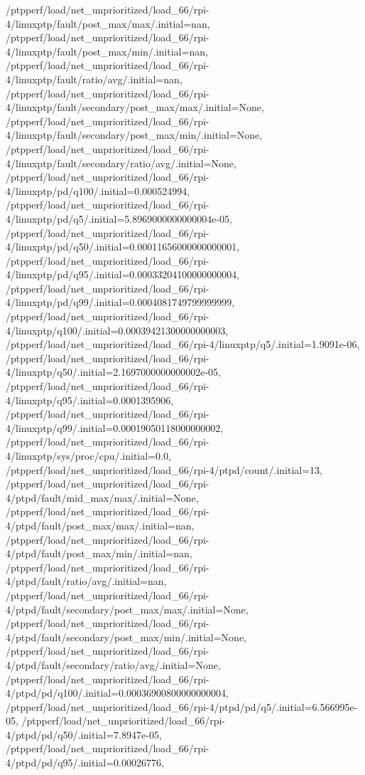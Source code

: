 {    /ptpperf/load/net_unprioritized/load_66/rpi-4/linuxptp/fault/post_max/max/.initial=nan,
    /ptpperf/load/net_unprioritized/load_66/rpi-4/linuxptp/fault/post_max/min/.initial=nan,
    /ptpperf/load/net_unprioritized/load_66/rpi-4/linuxptp/fault/ratio/avg/.initial=nan,
    /ptpperf/load/net_unprioritized/load_66/rpi-4/linuxptp/fault/secondary/post_max/max/.initial=None,
    /ptpperf/load/net_unprioritized/load_66/rpi-4/linuxptp/fault/secondary/post_max/min/.initial=None,
    /ptpperf/load/net_unprioritized/load_66/rpi-4/linuxptp/fault/secondary/ratio/avg/.initial=None,
    /ptpperf/load/net_unprioritized/load_66/rpi-4/linuxptp/pd/q100/.initial=0.000524994,
    /ptpperf/load/net_unprioritized/load_66/rpi-4/linuxptp/pd/q5/.initial=5.8969000000000004e-05,
    /ptpperf/load/net_unprioritized/load_66/rpi-4/linuxptp/pd/q50/.initial=0.00011656000000000001,
    /ptpperf/load/net_unprioritized/load_66/rpi-4/linuxptp/pd/q95/.initial=0.00033204100000000004,
    /ptpperf/load/net_unprioritized/load_66/rpi-4/linuxptp/pd/q99/.initial=0.0004081749799999999,
    /ptpperf/load/net_unprioritized/load_66/rpi-4/linuxptp/q100/.initial=0.00039421300000000003,
    /ptpperf/load/net_unprioritized/load_66/rpi-4/linuxptp/q5/.initial=1.9091e-06,
    /ptpperf/load/net_unprioritized/load_66/rpi-4/linuxptp/q50/.initial=2.1697000000000002e-05,
    /ptpperf/load/net_unprioritized/load_66/rpi-4/linuxptp/q95/.initial=0.0001395906,
    /ptpperf/load/net_unprioritized/load_66/rpi-4/linuxptp/q99/.initial=0.00019050118000000002,
    /ptpperf/load/net_unprioritized/load_66/rpi-4/linuxptp/sys/proc/cpu/.initial=0.0,
    /ptpperf/load/net_unprioritized/load_66/rpi-4/ptpd/count/.initial=13,
    /ptpperf/load/net_unprioritized/load_66/rpi-4/ptpd/fault/mid_max/max/.initial=None,
    /ptpperf/load/net_unprioritized/load_66/rpi-4/ptpd/fault/post_max/max/.initial=nan,
    /ptpperf/load/net_unprioritized/load_66/rpi-4/ptpd/fault/post_max/min/.initial=nan,
    /ptpperf/load/net_unprioritized/load_66/rpi-4/ptpd/fault/ratio/avg/.initial=nan,
    /ptpperf/load/net_unprioritized/load_66/rpi-4/ptpd/fault/secondary/post_max/max/.initial=None,
    /ptpperf/load/net_unprioritized/load_66/rpi-4/ptpd/fault/secondary/post_max/min/.initial=None,
    /ptpperf/load/net_unprioritized/load_66/rpi-4/ptpd/fault/secondary/ratio/avg/.initial=None,
    /ptpperf/load/net_unprioritized/load_66/rpi-4/ptpd/pd/q100/.initial=0.00036900800000000004,
    /ptpperf/load/net_unprioritized/load_66/rpi-4/ptpd/pd/q5/.initial=6.566995e-05,
    /ptpperf/load/net_unprioritized/load_66/rpi-4/ptpd/pd/q50/.initial=7.8947e-05,
    /ptpperf/load/net_unprioritized/load_66/rpi-4/ptpd/pd/q95/.initial=0.00026776,
}
